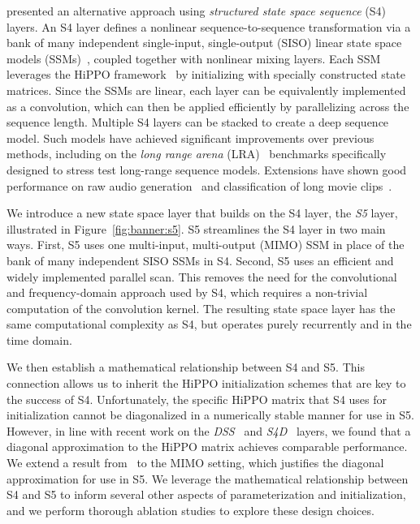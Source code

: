 \citet{gu2021s4} presented an alternative approach using \emph{structured state space sequence} (S4) layers.  An S4 layer defines a nonlinear sequence-to-sequence transformation via a bank of many independent single-input, single-output (SISO) linear state space models (SSMs)~\citep{gu2021lssl}, coupled together with nonlinear mixing layers.  Each SSM leverages the HiPPO framework~\citep{gu2020hippo} by initializing with specially constructed state matrices.  Since the SSMs are linear, each layer can be equivalently implemented as a convolution, which can then be applied efficiently by parallelizing across the sequence length. Multiple S4 layers can be stacked to create a deep sequence model.  Such models have achieved significant improvements over previous methods, including on the \emph{long range arena} (LRA)~\citep{tay2020lra} benchmarks specifically designed to stress test long-range sequence models. Extensions have shown good performance on raw audio generation~\citep{goel2022sashimi} and classification of long movie clips~\citep{islam2022long}. 

We introduce a new state space layer that builds on the S4 layer, the \emph{S5} layer, illustrated in Figure~\ref{fig:banner:s5}.  S5 streamlines the S4 layer in two main ways.  First, S5 uses one multi-input, multi-output (MIMO) SSM in place of the bank of many independent SISO SSMs in S4.  Second, S5 uses an efficient and widely implemented parallel scan.  This removes the need for the convolutional and frequency-domain approach used by S4, which requires a non-trivial computation of the convolution kernel. The resulting state space layer has the same computational complexity as S4, but operates purely recurrently and in the time domain. 

We then establish a mathematical relationship between S4 and S5. This connection allows us to inherit the HiPPO initialization schemes that are key to the success of S4.  Unfortunately, the specific HiPPO matrix that S4 uses for initialization cannot be diagonalized in a numerically stable manner for use in S5. However, in line with recent work on the \emph{DSS}~\citep{gupta2022dss} and \emph{S4D}~\citep{gu2022parameterization} layers, we found that a diagonal approximation to the HiPPO matrix achieves comparable performance. We extend a result from~\citet{gu2022parameterization} to the MIMO setting, which justifies the diagonal approximation for use in S5. We leverage the mathematical relationship between S4 and S5 to inform several other aspects of parameterization and initialization, and we perform thorough ablation studies to explore these design choices.

